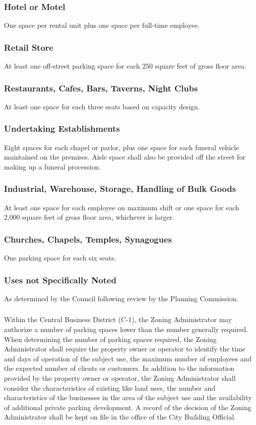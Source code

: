 \subsubsection{Hotel or Motel}
One space per rental unit plus one space per full-time employee.
\subsubsection{Retail Store}
At least one off-street parking space for each 250 square feet of gross floor area.
\subsubsection{Restaurants, Cafes, Bars, Taverns, Night Clubs}
At least one space for each three seats based on capacity design.
\subsubsection{Undertaking Establishments}
Eight spaces for each chapel or parlor, plus one space for each funeral vehicle maintained on the premises. Aisle space shall also be provided off the street for making up a funeral procession.
\subsubsection{Industrial, Warehouse, Storage, Handling of Bulk Goods}
At least one space for each employee on maximum shift or one space for each 2,000 square feet of gross floor area, whichever is larger.
\subsubsection{Churches, Chapels, Temples, Synagogues}
One parking space for each six seats.
\subsubsection{Uses not Specifically Noted}
As determined by the Council following review by the Planning Commission.
\subsubsection{}
Within the Central Business District (C-1), the Zoning Administrator may authorize a number of parking spaces lower than the number generally required. When determining the number of parking spaces required, the Zoning Administrator shall require the property owner or operator to identify the time and days of operation of the subject use, the maximum number of employees and the expected number of clients or customers. In addition to the information provided by the property owner or operator, the Zoning Administrator shall consider the characteristics of existing like land uses, the number and characteristics of the businesses in the area of the subject use and the availability of additional private parking development. A record of the decision of the Zoning Administrator shall be kept on file in the office of the City Building Official.
